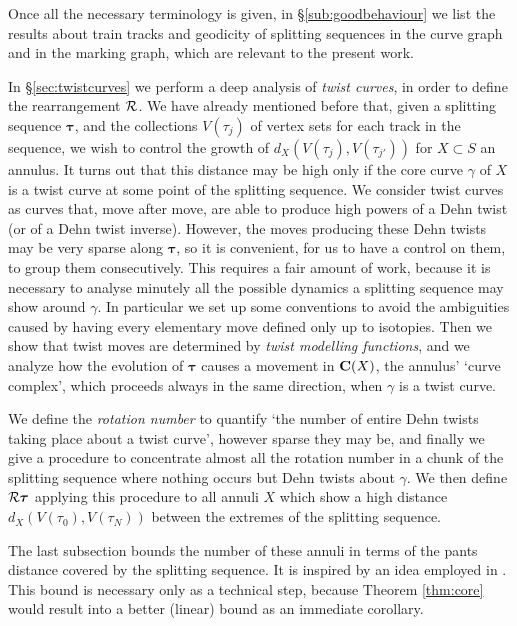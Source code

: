 Once all the necessary terminology is given, in \S \ref{sub:goodbehaviour} we list the results about train tracks and geodicity of splitting sequences in the curve graph and in the marking graph, which are relevant to the present work.

In \S \ref{sec:twistcurves} we perform a deep analysis of \emph{twist curves}, in order to define the rearrangement ${\mathcal R}$. We have already mentioned before that, given a splitting sequence $\bm\tau$, and the collections $V(\tau_j)$ of vertex sets for each track in the sequence, we wish to control the growth of $d_X\left(V(\tau_j),V(\tau_{j'})\right)$ for $X\subset S$ an annulus. It turns out that this distance may be high only if the core curve $\gamma$ of $X$ is a twist curve at some point of the splitting sequence. We consider twist curves as curves that, move after move, are able to produce high powers of a Dehn twist (or of a Dehn twist inverse). However, the moves producing these Dehn twists may be very sparse along $\bm\tau$, so it is convenient, for us to have a control on them, to group them consecutively. This requires a fair amount of work, because it is necessary to analyse minutely all the possible dynamics a splitting sequence may show around $\gamma$. In particular we set up some conventions to avoid the ambiguities caused by having every elementary move defined only up to isotopies. Then we show that twist moves are determined by \emph{twist modelling functions}, and we analyze how the evolution of $\bm\tau$ causes a movement in $\mathbf C(X)$, the annulus' `curve complex', which proceeds always in the same direction, when $\gamma$ is a twist curve.

We define the \emph{rotation number} to quantify `the number of entire Dehn twists taking place about a twist curve', however sparse they may be, and finally we give a procedure to concentrate almost all the rotation number in a chunk of the splitting sequence where nothing occurs but Dehn twists about $\gamma$. We then define ${\mathcal R}\bm\tau$ applying this procedure to all annuli $X$ which show a high distance $d_X\left(V(\tau_0),V(\tau_N)\right)$ between the extremes of the splitting sequence.

The last subsection bounds the number of these annuli in terms of the pants distance covered by the splitting sequence. It is inspired by an idea employed in \cite{masurminskyq}. This bound is necessary only as a technical step, because Theorem \ref{thm:core} would result into a better (linear) bound as an immediate corollary.

